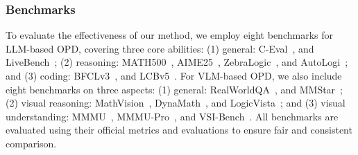 \documentclass[]{jingdong}
\theoremstyle{plain}
\theoremstyle{definition}
\theoremstyle{remark}
\begin{document}
\subsubsection{Benchmarks}
To evaluate the effectiveness of our method, we employ eight benchmarks for LLM-based OPD, covering three core abilities: (1) general: C-Eval~\citep{huang2023c}, and LiveBench~\citep{white2024livebench}; (2) reasoning: MATH500~\citep{hendrycks2021measuring}, AIME25~\citep{aime25aimi}, ZebraLogic~\citep{lin2025zebralogic}, and AutoLogi~\citep{zhu2025autologi}; and (3) coding: BFCLv3~\citep{bfcl24bfcl}, and LCBv5~\citep{jain2025livecodebench}. For VLM-based OPD, we also include eight benchmarks on three aspects: (1) general: RealWorldQA~\citep{realworld24real}, and MMStar~\citep{chen2024we}; (2) visual reasoning: MathVision~\citep{wang2024measuring}, DynaMath~\citep{zou2025dynamath}, and LogicVista~\citep{xiao2024logicvista}; and (3) visual understanding: MMMU~\citep{yue2024mmmu}, MMMU-Pro~\citep{yue2025mmmu}, and VSI-Bench~\citep{yang2025thinking}. All benchmarks are evaluated using their official metrics and evaluations to ensure fair and consistent comparison.
\end{document}
